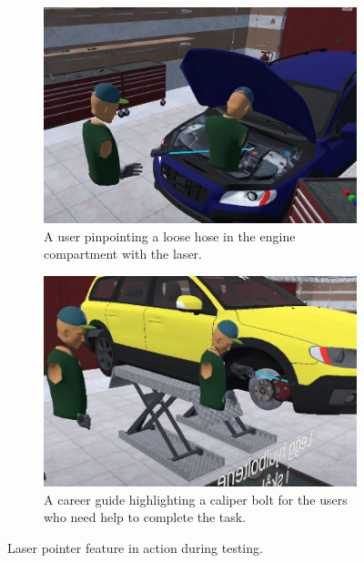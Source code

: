 \begin{figure}[]
  \centering
  \begin{subfigure}[b]{0.45\textwidth}
    \includegraphics[width=1\textwidth]{fig/phase_2/implementation/laser1.png}
    \caption{A user pinpointing a loose hose in the engine compartment with the laser.}
    \label{fig:laser1}
  \end{subfigure}
    \hfill%
  \begin{subfigure}[b]{0.45\textwidth}
    \includegraphics[width=1\textwidth]{fig/phase_2/implementation/laser2.PNG}
    \caption{A career guide highlighting a caliper bolt for the users who need help to complete the task.}
    \label{fig:laser2}
  \end{subfigure}
  \hfill%
  \caption{Laser pointer feature in action during testing.}
  \label{fig:phase2Laser}
\end{figure}


